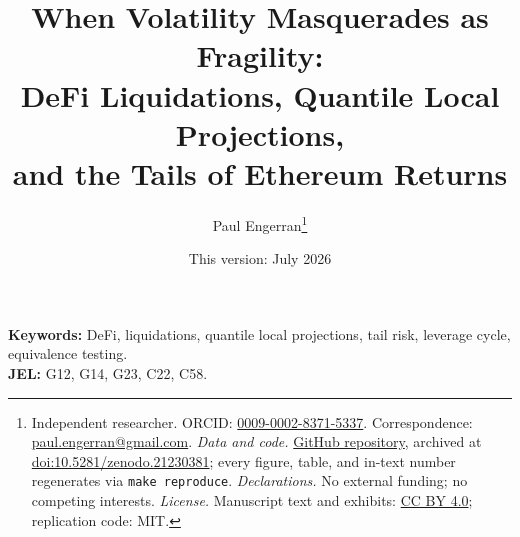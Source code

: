 \documentclass[12pt]{article}
\title{When Volatility Masquerades as Fragility: \\ DeFi Liquidations, Quantile Local Projections, \\ and the Tails of Ethereum Returns}
\author{Paul Engerran\thanks{%
Independent researcher. ORCID: \href{https://orcid.org/0009-0002-8371-5337}{0009-0002-8371-5337}. Correspondence: \href{mailto:paul.engerran@gmail.com}{paul.engerran@gmail.com}.\newline
\textit{Data and code.} \href{https://github.com/Paul-Engerran/DeFi-Endogenous-Fragility}{GitHub repository}, archived at \href{https://doi.org/10.5281/zenodo.21230381}{doi:10.5281/zenodo.21230381}; every figure, table, and in-text number regenerates via \texttt{make reproduce}.\newline
\textit{Declarations.} No external funding; no competing interests.\newline
\textit{License.} Manuscript text and exhibits: \href{https://creativecommons.org/licenses/by/4.0/}{CC BY 4.0}; replication code: MIT.%
}}
\date{This version: July 2026}
\begin{document}
\maketitle



\noindent\textbf{Keywords:} DeFi, liquidations, quantile local projections,
tail risk, leverage cycle, equivalence testing.\\
\textbf{JEL:} G12, G14, G23, C22, C58.






\clearpage
\appendix
\clearpage
\clearpage
\end{document}

